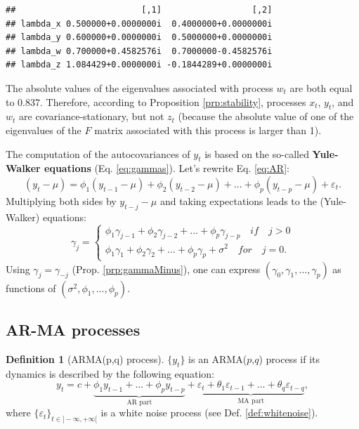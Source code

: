 \documentclass[
  12pt,
]{book}
\theoremstyle{definition}
\newtheorem{definition}{Definition}[chapter]
\theoremstyle{definition}
\theoremstyle{definition}
\theoremstyle{definition}
\theoremstyle{remark}
\begin{document}
\begin{verbatim}
##                         [,1]                  [,2]
## lambda_x 0.500000+0.0000000i  0.4000000+0.0000000i
## lambda_y 0.600000+0.0000000i  0.5000000+0.0000000i
## lambda_w 0.700000+0.4582576i  0.7000000-0.4582576i
## lambda_z 1.084429+0.0000000i -0.1844289+0.0000000i
\end{verbatim}

The absolute values of the eigenvalues associated with process \(w_t\) are both equal to 0.837. Therefore, according to Proposition \ref{prp:stability}, processes \(x_t\), \(y_t\), and \(w_t\) are covariance-stationary, but not \(z_t\) (because the absolute value of one of the eigenvalues of the \(F\) matrix associated with this process is larger than 1).

The computation of the autocovariances of \(y_t\) is based on the so-called \textbf{Yule-Walker equations} (Eq. \eqref{eq:gammas}). Let's rewrite Eq. \eqref{eq:AR}:
\[
(y_t-\mu) = \phi_1 (y_{t-1}-\mu) + \phi_2 (y_{t-2}-\mu) + \dots + \phi_p (y_{t-p}-\mu) + \varepsilon_t.
\]
Multiplying both sides by \(y_{t-j}-\mu\) and taking expectations leads to the (Yule-Walker) equations:
\begin{equation}
\gamma_j = \left\{
\begin{array}{l}
\phi_1 \gamma_{j-1}+\phi_2 \gamma_{j-2}+ \dots + \phi_p \gamma_{j-p} \quad if \quad j>0\\
\phi_1 \gamma_{1}+\phi_2 \gamma_{2}+ \dots + \phi_p \gamma_{p} + \sigma^2 \quad for \quad j=0.
\end{array}
\right.\label{eq:gammas}
\end{equation}
Using \(\gamma_j = \gamma_{-j}\) (Prop. \ref{prp:gammaMinus}), one can express \((\gamma_0,\gamma_1,\dots,\gamma_{p})\) as functions of \((\sigma^2,\phi_1,\dots,\phi_p)\).

\hypertarget{ar-ma-processes}{%
\subsection{AR-MA processes}\label{ar-ma-processes}}

\begin{definition}[ARMA(p,q) process]
\protect\hypertarget{def:ARMApq}{}\label{def:ARMApq}\(\{y_t\}\) is an ARMA(\(p\),\(q\)) process if its dynamics is described by the following equation:
\begin{equation}
y_t = c + \underbrace{\phi_1 y_{t-1} + \dots + \phi_p y_{t-p}}_{\mbox{AR part}} + \underbrace{\varepsilon_t + \theta_1 \varepsilon_{t-1} + \dots + \theta_q \varepsilon_{t-q}}_{\mbox{MA part}},\label{eq:ARMApq}
\end{equation}
where \(\{\varepsilon_t\}_{t \in ] -\infty,+\infty[}\) is a white noise process (see Def. \ref{def:whitenoise}).
\end{definition}
\end{document}
